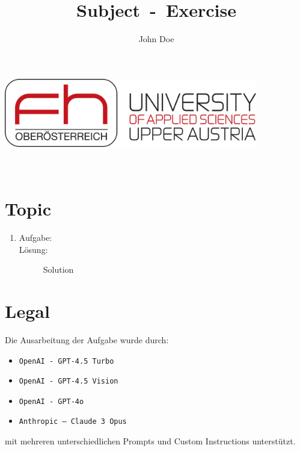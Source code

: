 \documentclass[a4paper,11pt]{report}
\author{John Doe} %
\newcommand{\coverpage}{
    \thispagestyle{cover}
    \begin{center}
        {\includegraphics[height=3cm]{fh-logo}}\\[1cm]
        {\LARGE \thetitle}\\[0.5cm]
        {\large \theauthor}\\
    \end{center}
    \tableofcontents
    \clearpage
}
\begin{document}
\title{Subject~-~Exercise}
\coverpage

\clearpage
{}
\pagestyle{main}

\chapter{Topic}
\begin{enumerate}
    \item \label{item:backrefA} \hfill %
    \begin{description}
        \item[Aufgabe:] 
         \hfill
        \item[Lösung:] \hfill \newline %
            Solution
    \end{description}
\end{enumerate}
\newpage

\chapter{Legal}
Die Ausarbeitung der Aufgabe wurde durch:

\begin{itemize}
    \item \texttt{OpenAI - GPT-4.5 Turbo}
    \item \texttt{OpenAI - GPT-4.5 Vision}
    \item \texttt{OpenAI - GPT-4o}
    \item \texttt{Anthropic -- Claude 3 Opus}
\end{itemize}


mit mehreren unterschiedlichen Prompts und Custom Instructions unterstützt.
\end{document}
